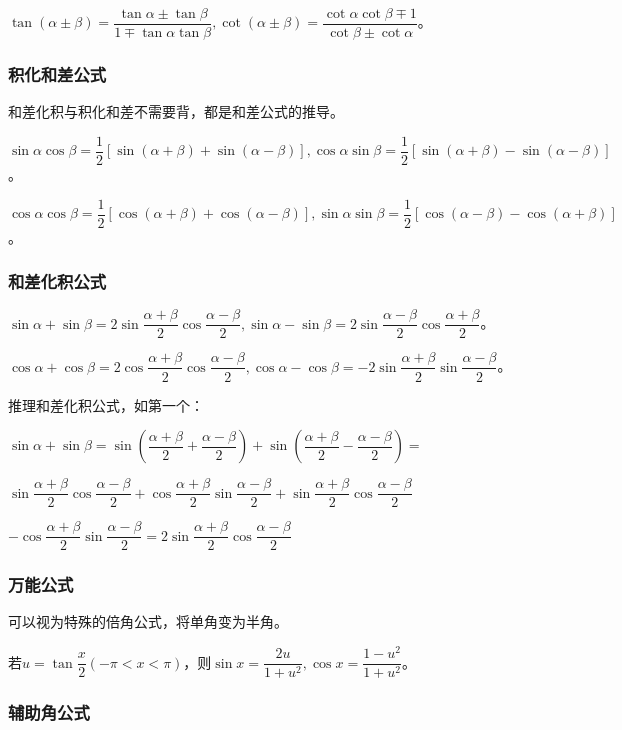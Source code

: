$\tan(\alpha\pm\beta)=\dfrac{\tan\alpha\pm\tan\beta}{1\mp\tan\alpha\tan\beta},\cot(\alpha\pm\beta)=\dfrac{\cot\alpha\cot\beta\mp 1}{\cot\beta\pm\cot\alpha}$。

\subsubsection{积化和差公式}

和差化积与积化和差不需要背，都是和差公式的推导。

$\sin\alpha\cos\beta=\dfrac{1}{2}[\sin(\alpha+\beta)+\sin(\alpha-\beta)],\cos\alpha\sin\beta=\dfrac{1}{2}[\sin(\alpha+\beta)-\sin(\alpha-\beta)]$。

$\cos\alpha\cos\beta=\dfrac{1}{2}[\cos(\alpha+\beta)+\cos(\alpha-\beta)],\sin\alpha\sin\beta=\dfrac{1}{2}[\cos(\alpha-\beta)-\cos(\alpha+\beta)]$。

\subsubsection{和差化积公式}

$\sin\alpha+\sin\beta=2\sin\dfrac{\alpha+\beta}{2}\cos\dfrac{\alpha-\beta}{2},\sin\alpha-\sin\beta=2\sin\dfrac{\alpha-\beta}{2}\cos\dfrac{\alpha+\beta}{2}$。

$\cos\alpha+\cos\beta=2\cos\dfrac{\alpha+\beta}{2}\cos\dfrac{\alpha-\beta}{2},\cos\alpha-\cos\beta=-2\sin\dfrac{\alpha+\beta}{2}\sin\dfrac{\alpha-\beta}{2}$。

推理和差化积公式，如第一个：

$\sin\alpha+\sin\beta=\sin\left(\dfrac{\alpha+\beta}{2}+\dfrac{\alpha-\beta}{2}\right)+\sin\left(\dfrac{\alpha+\beta}{2}-\dfrac{\alpha-\beta}{2}\right)=$

$\sin\dfrac{\alpha+\beta}{2}\cos\dfrac{\alpha-\beta}{2}+\cos\dfrac{\alpha+\beta}{2}\sin\dfrac{\alpha-\beta}{2}+\sin\dfrac{\alpha+\beta}{2}\cos\dfrac{\alpha-\beta}{2}$

$-\cos\dfrac{\alpha+\beta}{2}\sin\dfrac{\alpha-\beta}{2}=2\sin\dfrac{\alpha+\beta}{2}\cos\dfrac{\alpha-\beta}{2}$

\subsubsection{万能公式}

可以视为特殊的倍角公式，将单角变为半角。

若$u=\tan\dfrac{x}{2}(-\pi<x<\pi)$，则$\sin x=\dfrac{2u}{1+u^2},\cos x=\dfrac{1-u^2}{1+u^2}$。

\subsubsection{辅助角公式}

